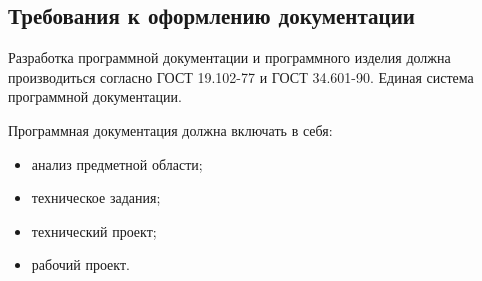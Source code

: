 \subsection{Требования к оформлению документации}

Разработка программной документации и программного изделия должна производиться согласно ГОСТ 19.102-77 и ГОСТ 34.601-90. Единая система программной документации.

Программная документация должна включать в себя:
\begin{itemize}
	\item анализ предметной области;
	\item техническое задания;
	\item технический проект;
	\item рабочий проект.
\end{itemize}